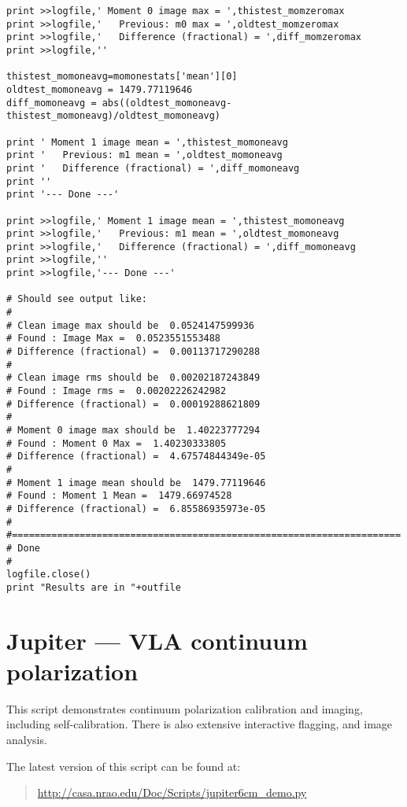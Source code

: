 \begin{verbatim}
print >>logfile,' Moment 0 image max = ',thistest_momzeromax
print >>logfile,'   Previous: m0 max = ',oldtest_momzeromax
print >>logfile,'   Difference (fractional) = ',diff_momzeromax
print >>logfile,''

thistest_momoneavg=momonestats['mean'][0]
oldtest_momoneavg = 1479.77119646
diff_momoneavg = abs((oldtest_momoneavg-thistest_momoneavg)/oldtest_momoneavg)

print ' Moment 1 image mean = ',thistest_momoneavg
print '   Previous: m1 mean = ',oldtest_momoneavg
print '   Difference (fractional) = ',diff_momoneavg
print ''
print '--- Done ---'

print >>logfile,' Moment 1 image mean = ',thistest_momoneavg
print >>logfile,'   Previous: m1 mean = ',oldtest_momoneavg
print >>logfile,'   Difference (fractional) = ',diff_momoneavg
print >>logfile,''
print >>logfile,'--- Done ---'

# Should see output like:
#
# Clean image max should be  0.0524147599936
# Found : Image Max =  0.0523551553488
# Difference (fractional) =  0.00113717290288
#
# Clean image rms should be  0.00202187243849
# Found : Image rms =  0.00202226242982
# Difference (fractional) =  0.00019288621809
#
# Moment 0 image max should be  1.40223777294
# Found : Moment 0 Max =  1.40230333805
# Difference (fractional) =  4.67574844349e-05
#
# Moment 1 image mean should be  1479.77119646
# Found : Moment 1 Mean =  1479.66974528
# Difference (fractional) =  6.85586935973e-05
#
#=====================================================================
# Done
#
logfile.close()
print "Results are in "+outfile
\end{verbatim}
\normalsize

\section{Jupiter --- VLA continuum polarization}
\label{section:scripts.jupiter}

This script demonstrates continuum polarization calibration and
imaging, including self-calibration.  There is also extensive
interactive flagging, and image analysis.

The latest version of this script can be found at:
\begin{quote}
   \url{http://casa.nrao.edu/Doc/Scripts/jupiter6cm_demo.py}
\end{quote}

